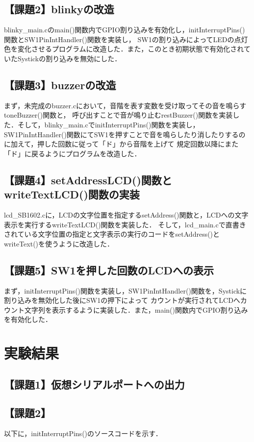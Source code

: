 \documentclass{jlreq}
\begin{document}
\subsection{【課題2】blinkyの改造}
blinky\_main.cのmain()関数内でGPIO割り込みを有効化し，initInterruptPins()関数とSW1PinIntHandler()関数を実装し，
SW1の割り込みによってLEDの点灯色を変化させるプログラムに改造した．また，このとき初期状態で有効化されていたSystickの割り込みを無効にした．

\subsection{【課題3】buzzerの改造}
まず，未完成のbuzzer.cにおいて，音階を表す変数を受け取ってその音を鳴らすtoneBuzzer()関数と，
呼び出すことで音が鳴り止むrestBuzzer()関数を実装した．そして，blinky\_main.cでinitInterruptPins()関数を実装し，
SW1PinIntHandler()関数にてSW1を押すことで音を鳴らしたり消したりするのに加えて，押した回数に従って「ド」から音階を上げて
規定回数以降にまた「ド」に戻るようにプログラムを改造した．

\subsection{【課題4】setAddressLCD()関数とwriteTextLCD()関数の実装}
lcd\_SB1602.cに，LCDの文字位置を指定するsetAddress()関数と，LCDへの文字表示を実行するwriteTextLCD()関数を実装した．
そして，lcd\_main.cで直書きされている文字位置の指定と文字表示の実行のコードをsetAddress()とwriteText()を使うように改造した．

\subsection{【課題5】SW1を押した回数のLCDへの表示}
まず，initInterruptPins()関数を実装し，SW1PinIntHandler()関数を，Systickに割り込みを無効化した後にSW1の押下によって
カウントが実行されてLCDへカウント文字列を表示するように実装した．また，main()関数内でGPIO割り込みを有効化した．

\section{実験結果}

\subsection{【課題1】仮想シリアルポートへの出力}


\subsection{【課題2】}
以下に，initInterruptPins()のソースコードを示す．
\end{document}
